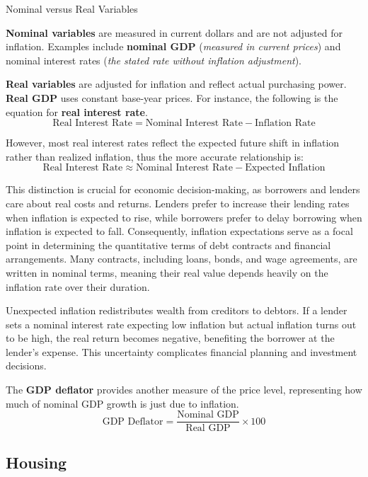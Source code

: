 \documentclass[10pt]{article}
\begin{document}
    \begin{core}{Nominal versus Real Variables}

      \textbf{Nominal variables} are measured in current dollars and are not adjusted for inflation. Examples include \textbf{nominal GDP} (\textit{measured in current prices}) and nominal interest rates (\textit{the stated rate without inflation adjustment}).

      \textbf{Real variables} are adjusted for inflation and reflect actual purchasing power. \textbf{Real GDP} uses constant base-year prices. For instance, the following is the equation for \textbf{real interest rate}.
      \[
        \text{Real Interest Rate} = \text{Nominal Interest Rate} - \text{Inflation Rate}
      \]

      However, most real interest rates reflect the expected future shift in inflation rather than realized inflation, thus the more accurate relationship is:
      \[
        \text{Real Interest Rate} \approx \text{Nominal Interest Rate} - \text{Expected Inflation}
      \]

      This distinction is crucial for economic decision-making, as borrowers and lenders care about real costs and returns. Lenders prefer to increase their lending rates when inflation is expected to rise, while borrowers prefer to delay borrowing when inflation is expected to fall. Consequently, inflation expectations serve as a focal point in determining the quantitative terms of debt contracts and financial arrangements. Many contracts, including loans, bonds, and wage agreements, are written in nominal terms, meaning their real value depends heavily on the inflation rate over their duration.

      Unexpected inflation redistributes wealth from creditors to debtors. If a lender sets a nominal interest rate expecting low inflation but actual inflation turns out to be high, the real return becomes negative, benefiting the borrower at the lender's expense. This uncertainty complicates financial planning and investment decisions.

      The \textbf{GDP deflator} provides another measure of the price level, representing how much of nominal GDP growth is just due to inflation.
      \[
        \text{GDP Deflator} = \frac{\text{Nominal GDP}}{\text{Real GDP}} \times 100
      \]

    \end{core}

    \subsection{Housing}
\end{document}
